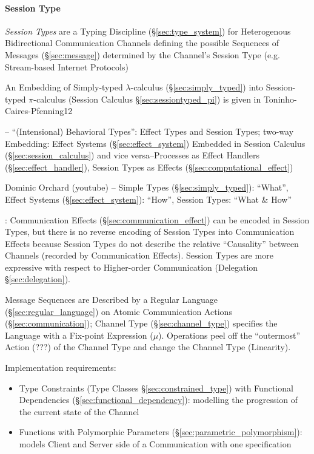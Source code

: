 \paragraph{Session Type}\label{sec:session_type}\hfill

\emph{Session Types} are a Typing Discipline (\S\ref{sec:type_system})
for Heterogenous Bidirectional Communication Channels defining the
possible Sequences of Messages (\S\ref{sec:message}) determined by the
Channel's Session Type (e.g. Stream-based Internet Protocols)
\cite{neubauer-thiemann04}

An Embedding of Simply-typed $\lambda$-calculus
(\S\ref{sec:simply_typed}) into Session-typed $\pi$-calculus (Session
Calculus \S\ref{sec:sessiontyped_pi}) is given in
Toninho-Caires-Pfenning12 \cite{caires-pfenning-toninho12}

\cite{orchard-yoshida16} -- ``(Intensional) Behavioral Types'': Effect
Types and Session Types; two-way Embedding: Effect Systems
(\S\ref{sec:effect_system}) Embedded in Session Calculus
(\S\ref{sec:session_calculus}) and vice versa--Processes as Effect
Handlers (\S\ref{sec:effect_handler}), Session Types as Effects
(\S\ref{sec:computational_effect})

Dominic Orchard (youtube) -- Simple Types (\S\ref{sec:simply_typed}):
``What'', Effect Systems (\S\ref{sec:effect_system}): ``How'', Session
Types: ``What \& How''

\cite{orchard-yoshida16}: Communication Effects
(\S\ref{sec:communication_effect}) can be encoded in Session Types,
but there is no reverse encoding of Session Types into Communication
Effects because Session Types do not describe the relative
``Causality'' between Channels (recorded by Communication Effects).
Session Types are more expressive with respect to Higher-order
Communication (Delegation \S\ref{sec:delegation}).

Message Sequences are Described by a Regular Language
(\S\ref{sec:regular_language}) on Atomic Communication Actions
(\S\ref{sec:communication}); Channel Type (\S\ref{sec:channel_type})
specifies the Language with a Fix-point Expression ($\mu$). Operations
peel off the ``outermost'' Action (???) of the Channel Type and change
the Channel Type (Linearity). \cite{neubauer-thiemann04}

Implementation requirements: \cite{neubauer-thiemann04}
\begin{itemize}
  \item Type Constraints (Type Classes \S\ref{sec:constrained_type})
    with Functional Dependencies (\S\ref{sec:functional_dependency}):
    modelling the progression of the current state of the Channel
  \item Functions with Polymorphic Parameters
    (\S\ref{sec:parametric_polymorphism}): models Client and Server
    side of a Communication with one specification
\end{itemize}

